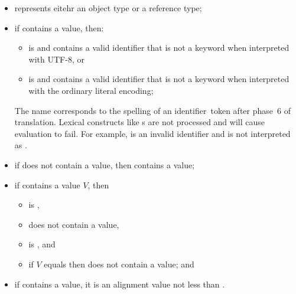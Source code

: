 \begin{itemdescr}
\pnum
\constantwhen
\begin{itemize}
\item
   represents eitehr an object type or a reference type;
\item
  if  contains a value, then:
  \begin{itemize}
  \item
     is 
    and 
    contains a valid identifier
    that is not a keyword
    when interpreted with UTF-8, or
  \item
     is 
    and 
    contains a valid identifier
    that is not a keyword
    when interpreted with the ordinary literal encoding;
  \end{itemize}
  \begin{note}
  The name corresponds to the spelling of an identifier~token
  after phase~6 of translation.
  Lexical constructs like
  s are not processed
  and will cause evaluation to fail.
  For example,  is an invalid identifier
  and is not interpreted as .
  \end{note}
\item
  if  does not contain a value,
  then  contains a value;
\item
  if  contains a value $V$, then
  \begin{itemize}
  \item
     is ,
  \item
     does not contain a value,
  \item
     is , and
  \item
    if $V$ equals 
    then  does not contain a value; and
  \end{itemize}
  \item
    if  contains a value,
    it is an alignment value
    not less than .
\end{itemize}


\end{itemdescr}
